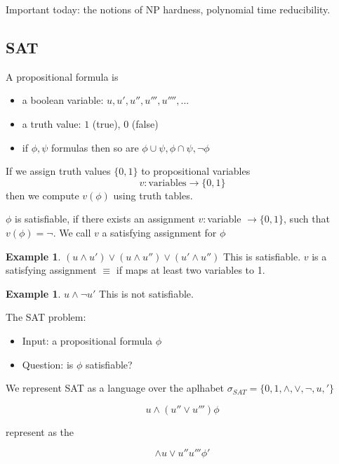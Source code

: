 \documentclass[a4paper,12pt]{article}
\theoremstyle{definition}
\newtheorem{example}[counter]{Example}
\theoremstyle{remark}
\begin{document}
Important today: the notions of NP hardness, polynomial time reducibility.

\subsection{SAT}

A propositional formula is
\begin{itemize}
    \item a boolean variable: $u, u', u'', u''', u'''', ...$
    \item a truth value: $1$ (true), $0$ (false)
    \item if $\phi, \psi$ formulas then so are $\phi \cup \psi, \phi \cap \psi, \neg \phi$
\end{itemize}

If we assign truth values $\{0, 1\}$ to propositional variables
\begin{equation*}
    v: \text{variables} \to \{0, 1\}
\end{equation*}
then we compute $v(\phi)$ using truth tables.

$\phi$ is satisfiable, if there exists an assignment $v: $variable $ \to \{0, 1\}$, such that $v(\phi) = \neg$.
We call $v$ a satisfying assignment for $\phi$ 

\begin{example}
    $(u \land u') \lor (u \land u'') \lor (u' \land u'')$
    This is satisfiable. $v$ is a satisfying assignment $\equiv$ if maps at least two variables to 1.
\end{example}

\begin{example}
    $u \land \neg u'$
    This is not satisfiable.
\end{example}

The SAT problem:
\begin{itemize}
    \item Input: a propositional formula $\phi$
    \item Question: is $\phi$ satisfiable?
\end{itemize}

We represent SAT as a language over the aplhabet $\sigma_{SAT} = \{0, 1, \land, \lor, \neg, u, '\}$

\begin{equation*}
    u \land (u'' \lor u''') \phi
\end{equation*}

represent as the

\begin{equation*}
    \land u \lor u'' u''' \phi'
\end{equation*}
\end{document}
